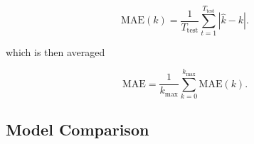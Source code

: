 \begin{equation}
  \mbox{MAE}(k) = \frac{1}{T_{\textrm{test}}} \sum_{t=1}^{T_\textrm{test}}\left| \hat{k} - k \right|.
\end{equation}

which is then averaged

\begin{equation}
  \mbox{MAE} = \frac{1}{k_{\max}} \sum_{k=0}^{k_{\max}} \mbox{MAE}(k).
\end{equation}


\subsection{Model Comparison}%
\label{ssec:model_comparsion}

%         
%         
%         

